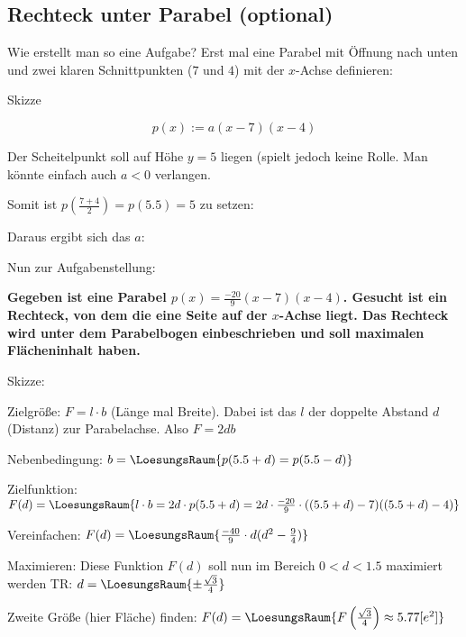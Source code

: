 \subsection{Rechteck unter Parabel (optional)}

Wie erstellt man so eine Aufgabe? Erst mal eine Parabel mit Öffnung nach unten und zwei klaren Schnittpunkten (\zB $7$ und $4$) mit der $x$-Achse definieren:

Skizze


$$p(x) := a(x-7)(x-4)$$

Der Scheitelpunkt soll auf Höhe $y=5$ liegen (spielt jedoch keine Rolle. Man könnte einfach auch $a<0$ verlangen.

Somit ist $p(\frac{7+4}2) = p(5.5) = 5$ zu setzen:



Daraus ergibt sich das $a$:

\newpage

Nun zur Aufgabenstellung:

\textbf{Gegeben ist eine Parabel $p(x) = \frac{-20}9(x-7)(x-4)$. Gesucht ist ein Rechteck, von dem die eine Seite auf der $x$-Achse liegt. Das Rechteck wird unter dem Parabelbogen einbeschrieben und soll maximalen Flächeninhalt haben.}

Skizze:


Zielgröße: $F = l\cdot{}b$ (Länge mal Breite). Dabei ist das $l$ der doppelte Abstand $d$ (Distanz) zur Parabelachse.
Also $F = 2db$

Nebenbedingung: $b = \LoesungsRaum{p(5.5 + d) = p(5.5-d)}$

Zielfunktion: $F(d) = \LoesungsRaum{l\cdot{}b = 2d\cdot{}p(5.5+d) = 2d\cdot{}\frac{-20}9\cdot((5.5+d)-7)((5.5+d)-4)}$

Vereinfachen:
$F(d) = \LoesungsRaum{\frac{-40}9\cdot{}d(d^2-\frac94)}$

Maximieren: Diese Funktion $F(d)$ soll nun im Bereich $0<d<1.5$ maximiert werden TR: $d = \LoesungsRaum{\pm\frac{\sqrt{3}}4}$

Zweite Größe (hier Fläche) finden: $F(d) = \LoesungsRaum{F\left(\frac{\sqrt{3}}4\right) \approx 5.77 [e^2]}$


